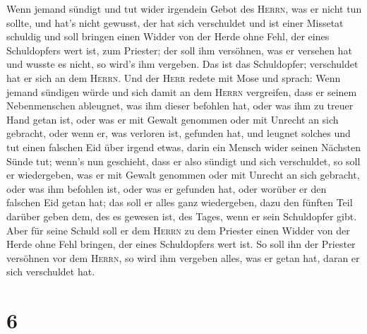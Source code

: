  Wenn jemand sündigt und tut wider irgendein Gebot des
\textsc{Herrn}, was er nicht tun sollte, und hat's nicht gewusst, der
hat sich verschuldet und ist einer Missetat schuldig  und
soll bringen einen Widder von der Herde ohne Fehl, der eines
Schuldopfers wert ist, zum Priester; der soll ihm versöhnen, was er
versehen hat und wusste es nicht, so wird's ihm vergeben.
 Das ist das Schuldopfer; verschuldet hat er sich an dem
\textsc{Herrn}.  Und der \textsc{Herr} redete mit Mose
und sprach:  Wenn jemand sündigen würde und sich damit an
dem \textsc{Herrn} vergreifen, dass er seinem Nebenmenschen ableugnet,
was ihm dieser befohlen hat, oder was ihm zu treuer Hand getan ist, oder
was er mit Gewalt genommen oder mit Unrecht an sich gebracht,
 oder wenn er, was verloren ist, gefunden hat, und
leugnet solches und tut einen falschen Eid über irgend etwas, darin ein
Mensch wider seinen Nächsten Sünde tut;  wenn's nun
geschieht, dass er also sündigt und sich verschuldet, so soll er
wiedergeben, was er mit Gewalt genommen oder mit Unrecht an sich
gebracht, oder was ihm befohlen ist, oder was er gefunden hat,
 oder worüber er den falschen Eid getan hat; das soll er
alles ganz wiedergeben, dazu den fünften Teil darüber geben dem, des es
gewesen ist, des Tages, wenn er sein Schuldopfer gibt. 
Aber für seine Schuld soll er dem \textsc{Herrn} zu dem Priester einen
Widder von der Herde ohne Fehl bringen, der eines Schuldopfers wert ist.
 So soll ihn der Priester versöhnen vor dem
\textsc{Herrn}, so wird ihm vergeben alles, was er getan hat, daran er
sich verschuldet hat.

\hypertarget{section-5}{%
\section{6}\label{section-5}}

